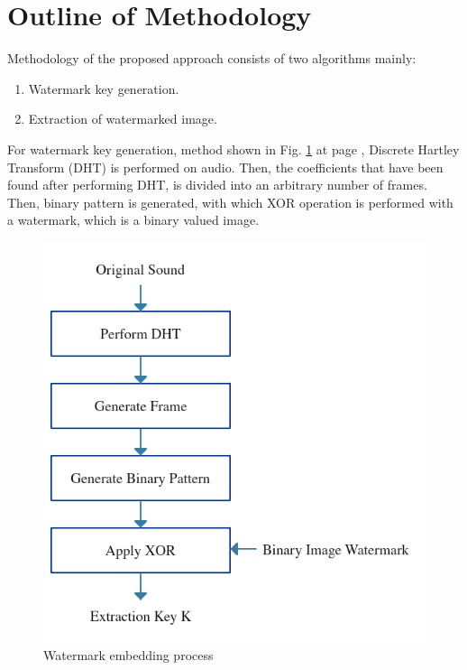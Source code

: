 \documentclass[12pt,a4paper]{article}
\begin{document}
\section{Outline of Methodology}

Methodology of the proposed approach consists of two algorithms mainly:

\begin{enumerate}
\item Watermark key generation.
\item Extraction of watermarked image.
\end{enumerate}

For watermark key generation, method shown in Fig. \ref{fig:embedding} at page \pageref{fig:embedding}, Discrete Hartley Transform (DHT) is performed on audio. Then, the coefficients that have been found after performing DHT, is divided into an arbitrary number of frames. Then, binary pattern is generated, with which XOR operation is performed with a watermark, which is a binary valued image.

\begin{figure}[h!]
\centering
\includegraphics[scale=.7]{image/Embedding(proposal).png}
\caption{Watermark embedding process}
\label{fig:embedding}
\end{figure}
\end{document}
